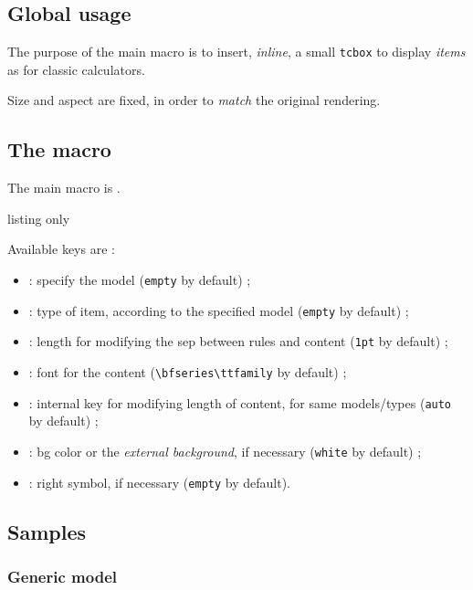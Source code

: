 \documentclass[11pt,a4paper]{ltxdoc}
\begin{document}
\subsection{Global usage}

The purpose of the main macro is to insert, \textit{inline}, a small \texttt{tcbox} to display \textit{items} as for classic calculators.

Size and aspect are fixed, in order to \textit{match} the original rendering.

\subsection{The macro}

The main macro is \ShowCode{\\CalcItemMenu}.

\begin{DemoCode}{listing only}
\end{DemoCode}

Available keys are :

\begin{itemize}[leftmargin=*]
	\item {} : specify the model (\texttt{empty} by default) ;
	\item {} : type of item, according to the specified model (\texttt{empty} by default) ;
	\item {} : length for modifying the sep between rules and content (\texttt{1pt} by default) ;
	\item {} : font for the content (\texttt{\textbackslash bfseries\textbackslash ttfamily} by default) ;
	\item {} : internal key for modifying length of content, for same models/types (\texttt{auto} by default) ;
	\item {} : bg color or the \textit{external background}, if necessary (\texttt{white} by default) ;
	\item {} : right symbol, if necessary (\texttt{empty} by default).
\end{itemize}

\subsection{Samples}

\subsubsection{Generic model}
\end{document}
